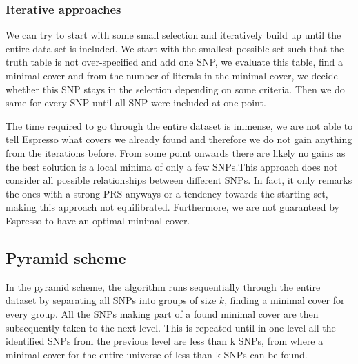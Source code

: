 \documentclass[letterpaper, 11pt]{article}
\begin{document}
\subsubsection{Iterative approaches}
\begin{figure} [!h] 
\end{figure}
We can try to start with some small selection and iteratively build up until the entire data set is included. We start with the smallest possible set such that the truth table is not over-specified and add one SNP, we evaluate this table, find a minimal cover and from the number of literals in the minimal cover, we decide whether this SNP stays in the selection depending on some criteria. Then we do same for every SNP until all SNP were included at one point. 

The time required to go through the entire dataset is immense, we are not able to tell Espresso what covers we already found and therefore we do not gain anything from the iterations before.  From some point onwards there are likely no gains as the best solution is a local minima of only a few SNPs.This approach does not consider all possible relationships between different SNPs. In fact, it only remarks the ones with a strong PRS anyways or a  tendency towards the starting set, making this approach not equilibrated. Furthermore, we are not guaranteed by Espresso to have an optimal minimal cover.

\subsection{Pyramid scheme}
In the pyramid scheme, the algorithm runs sequentially through the entire dataset by separating all SNPs into groups of size $k$, finding a minimal cover for every group. All the SNPs making part of a found minimal cover are then subsequently taken to the next level. This is repeated until in one level  all the identified SNPs from the previous level are less than k SNPs, from where a minimal cover for the entire universe of less than k SNPs can be found. \\
\end{document}
